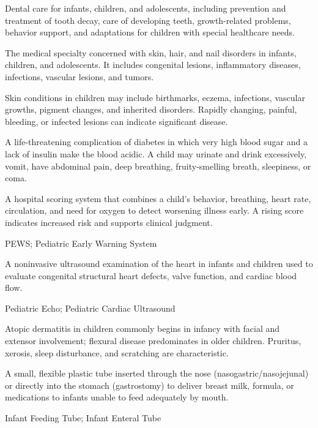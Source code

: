  Dental care for infants, children, and adolescents, including prevention and treatment of tooth decay, care of developing teeth, growth-related problems, behavior support, and adaptations for children with special healthcare needs.

 The medical specialty concerned with skin, hair, and nail disorders in infants, children,
and adolescents. It includes congenital lesions, inflammatory diseases, infections, vascular lesions, and tumors.

 Skin conditions in children may include birthmarks, eczema, infections, vascular growths, pigment changes, and inherited disorders. Rapidly changing, painful, bleeding, or infected lesions can indicate significant disease.

 A life-threatening complication of diabetes in which very high blood sugar and a lack of insulin make the blood acidic. A child may urinate and drink excessively, vomit, have abdominal pain, deep breathing, fruity-smelling breath, sleepiness, or coma.

 A hospital scoring system that combines a child’s behavior, breathing, heart rate, circulation, and need for oxygen to detect worsening illness early. A rising score indicates increased risk and supports clinical judgment.

\synonyms
PEWS; Pediatric Early Warning System

 A noninvasive ultrasound examination of the heart in infants and children used to evaluate congenital structural heart defects, valve function, and cardiac blood flow.

\synonyms
Pediatric Echo; Pediatric Cardiac Ultrasound

 Atopic dermatitis in children commonly begins in infancy with facial and extensor
involvement; flexural disease predominates in older children. Pruritus, xerosis, sleep
disturbance, and scratching are characteristic.

 A small, flexible plastic tube inserted through the nose (nasogastric/nasojejunal) or directly into the stomach (gastrostomy) to deliver breast milk, formula, or medications to infants unable to feed adequately by mouth.

\synonyms
Infant Feeding Tube; Infant Enteral Tube

